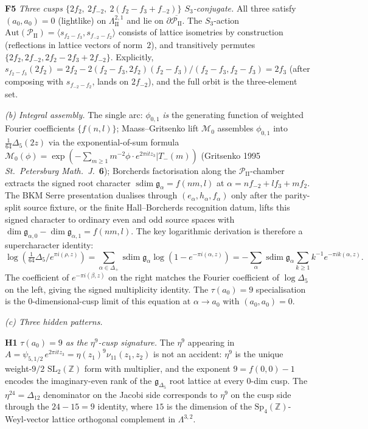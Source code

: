 \begin{remark}
\textbf{F5} \textit{Three cusps $\{2f_2,\ 2f_{-2},\ 2(f_2-f_3+f_{-2})\}$ $S_3$-conjugate.} All three satisfy $(a_0, a_0) = 0$ (lightlike) on $\Lambda^{2,1}_{\mathrm{II}}$ and lie on $\partial\overline{\mathcal P_{\mathrm{II}}}$. The $S_3$-action $\mathrm{Aut}(\mathcal P_{\mathrm{II}}) = \langle s_{f_2-f_3}, s_{f_{-2}-f_2}\rangle$ consists of lattice isometries by construction (reflections in lattice vectors of norm~$2$), and transitively permutes $\{2f_2, 2f_{-2}, 2f_2 - 2f_3 + 2f_{-2}\}$. Explicitly, $s_{f_2-f_3}(2 f_2) = 2 f_2 - 2(f_2-f_3, 2f_2)(f_2-f_3)/(f_2-f_3, f_2-f_3) = 2 f_3$ (after composing with $s_{f_{-2}-f_2}$, lands on $2 f_{-2}$), and the full orbit is the three-element set.

\emph{(b) Integral assembly.} The single arc: $\phi_{0,1}$ \emph{is} the generating function of weighted Fourier coefficients $\{f(n,l)\}$; Maass--Gritsenko lift $\mathcal M_0$ assembles $\phi_{0,1}$ into $\tfrac{1}{64}\Delta_5(2z)$ via the exponential-of-sum formula $\mathcal M_0(\phi) = \exp(-\sum_{m\geq 1} m^{-2}\phi\cdot e^{2\pi i t z_3}|T_-(m))$ (Gritsenko 1995 \emph{St.~Petersburg Math.\ J.}~\textbf{6}); Borcherds factorisation along the $\mathcal P_{\mathrm{II}}$-chamber extracts the signed root character $\operatorname{sdim}\mathfrak g_\alpha = f(nm,l)$ at $\alpha = n f_{-2} + l f_3 + m f_2$. The BKM Serre presentation dualises through $(e_\alpha, h_\alpha, f_\alpha)$ only after the parity-split source fixture, or the finite Hall--Borcherds recognition datum, lifts this signed character to ordinary even and odd source spaces with $\dim\mathfrak g_{\alpha,0}-\dim\mathfrak g_{\alpha,1}=f(nm,l)$. The key logarithmic derivation is therefore a supercharacter identity:
\[
 \log(\tfrac{1}{64}\Delta_5/e^{\pi i(\rho,z)})
 =
 \sum_{\alpha\in\Delta_+}
 \operatorname{sdim}\mathfrak g_\alpha
 \log(1 - e^{-\pi i(\alpha,z)})
 =
 -\sum_\alpha
 \operatorname{sdim}\mathfrak g_\alpha
 \sum_{k\geq 1}k^{-1}e^{-\pi i k(\alpha,z)}.
\]
The coefficient of $e^{-\pi i(\beta,z)}$ on the right matches the Fourier coefficient of $\log\Delta_5$ on the left, giving the signed multiplicity identity. The $\tau(a_0) = 9$ specialisation is the $0$-dimensional-cusp limit of this equation at $\alpha\to a_0$ with $(a_0,a_0) = 0$.

\emph{(c) Three hidden patterns.}

\textbf{H1} \textit{$\tau(a_0) = 9$ as the $\eta^9$-cusp signature.} The $\eta^9$ appearing in $A = \psi_{5,1/2}\,e^{2\pi i t z_3} = \eta(z_1)^9\nu_{11}(z_1,z_2)$ is not an accident: $\eta^9$ is the unique weight-$9/2$ $\mathrm{SL}_2(\mathbb Z)$ form with multiplier, and the exponent $9 = f(0,0) - 1$ encodes the imaginary-even rank of the $\mathfrak g_{\Delta_5}$ root lattice at every $0$-dim cusp. The $\eta^{24} = \Delta_{12}$ denominator on the Jacobi side corresponds to $\eta^9$ on the cusp side through the $24 - 15 = 9$ identity, where $15$ is the dimension of the $\mathrm{Sp}_4(\mathbb Z)$-Weyl-vector lattice orthogonal complement in $\Lambda^{3,2}$.


\end{remark}
